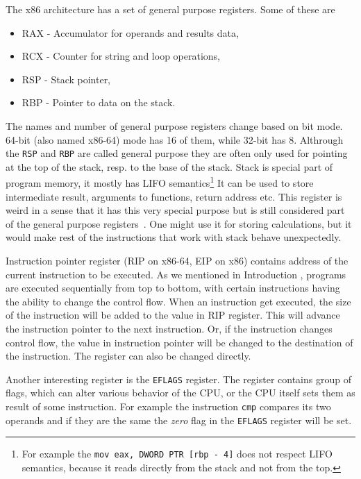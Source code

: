 The x86 architecture has a set of general purpose registers.
Some of these are
\begin{itemize}
    \item RAX - Accumulator for operands and results data,
    \item RCX - Counter for string and loop operations,
    \item RSP - Stack pointer,
    \item RBP - Pointer to data on the stack.
\end{itemize}
The names and number of general purpose registers change based on bit mode.
64-bit (also named x86-64) mode has 16 of them, while 32-bit has 8. Althrough
the \texttt{RSP} and \texttt{RBP} are called general purpose they are often
only used for pointing at the top of the stack, resp. to the base of the stack.
Stack is special part of program memory, it mostly has LIFO
semantics\footnote{For example the \texttt{mov eax, DWORD PTR [rbp - 4]} does
not respect LIFO semantics, because it reads directly from the stack and not
from the top.} It can be used to store intermediate result, arguments to
functions, return address etc. This register is weird in a sense that it has
this very special purpose but is still considered part of the general purpose
registers~\cite{intel-manual}. One might use it for storing calculations, but
it would make rest of the instructions that work with stack behave
unexpectedly.

Instruction pointer register (RIP on x86-64, EIP on x86) contains address of
the current instruction to be executed. As we mentioned in Introduction
, programs are executed sequentially from top to bottom, with certain
instructions having the ability to change the control flow. When an instruction
get executed, the size of the instruction will be added to the value in RIP
register. This will advance the instruction pointer to the next instruction.
Or, if the instruction changes control flow, the value in instruction pointer
will be changed to the destination of the instruction. The register can also be
changed directly.

Another interesting register is the \texttt{EFLAGS} register. The register
contains group of flags, which can alter various behavior of the CPU, or the
CPU itself sets them as result of some instruction. For example the instruction
\texttt{cmp} compares its two operands and if they are the same the
\textit{zero} flag in the \texttt{EFLAGS} register will be set.

